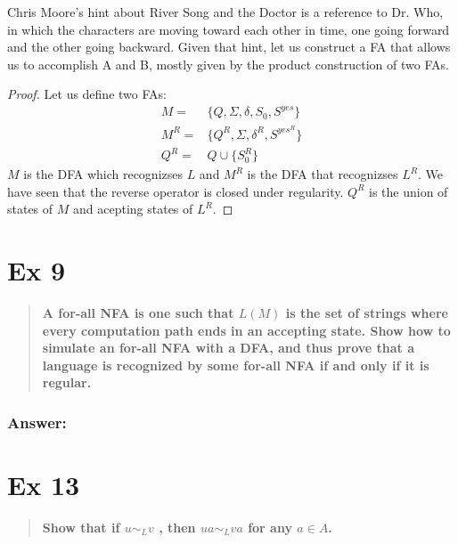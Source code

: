 \documentclass[titlepage]{article}\usepackage[]{graphicx}\usepackage[]{color}
\begin{document}
Chris Moore's hint about River Song and the Doctor is a reference to Dr. Who,
in which the characters are moving toward each other in time, one going
forward and the other going backward. Given that hint, let us construct a FA
that allows us to accomplish A and B, mostly given by the product construction
of two FAs.

\begin{proof}
	Let us define two FAs:
	\begin{align}
		M =& \{Q, \Sigma, \delta, S_0, S^{yes}\} \\
		M^R =& \{ Q^R, \Sigma, \delta^R, S^{yes^R} \} \\
		Q^R = & Q \cup \{S_{0}^R \}
	\end{align}
	$M$ is the DFA which recognizses $L$ and $M^R$ is the DFA that recognizses
	$L^R$. We have seen that the reverse operator is closed under
	regularity. $Q^R$ is the union of states of $M$ and acepting states of
	$L^R$.

\end{proof}






\section*{Ex 9}
\begin{quote}
  \textbf{A for-all NFA is one such that $L(M)$ is the set of strings where every
  computation path ends in an accepting state. Show how to simulate an for-all
  NFA with a DFA, and thus prove that a language is recognized by some for-all
  NFA if and only if it is regular.}
\end{quote}

\subsubsection*{Answer:}
\vspace{8cm}



\section*{Ex 13}
\begin{quote}
  \textbf{Show that if $u ∼_L v$ , then $u a ∼_L v a$ for any $a \in A$.}
\end{quote}
\end{document}
